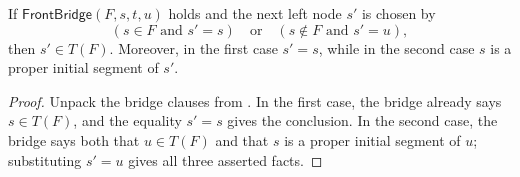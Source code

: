 \begin{lemma}
If $\mathsf{FrontBridge}(F,s,t,u)$ holds and the next left node $s'$ is
chosen by
\[
 (s\in F\text{ and }s'=s)\quad\text{or}\quad
 (s\notin F\text{ and }s'=u),
\]
then $s'\in T(F)$.  Moreover, in the first case $s'=s$, while in the
second case $s$ is a proper initial segment of $s'$.
\end{lemma}
\begin{proof}
Unpack the bridge clauses from .  In the first
case, the bridge already says $s\in T(F)$, and the equality $s'=s$
gives the conclusion.  In the second case, the bridge says both that
$u\in T(F)$ and that $s$ is a proper initial segment of $u$; substituting
$s'=u$ gives all three asserted facts.
\end{proof}
